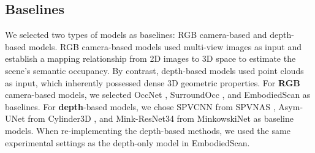 \documentclass[letterpaper, 10 pt, conference]{ieeeconf}  %
\begin{document}
\subsection{Baselines}
We selected two types of models as baselines: RGB camera-based and depth-based models. RGB camera-based models used multi-view images as input and establish a mapping relationship from 2D images to 3D space to estimate the scene's semantic occupancy.  By contrast, depth-based models used point clouds as input, which inherently possessed dense 3D geometric properties. For \textbf{RGB} camera-based models, we selected OccNet \cite{tong2023scene}, SurroundOcc \cite{wei2023surroundocc}, and EmbodiedScan \cite{wang2024embodiedscan} as baselines. For \textbf{depth}-based models, we chose SPVCNN from SPVNAS \cite{tang2020searching}, Asym-UNet from Cylinder3D \cite{zhu2021cylindrical}, and Mink-ResNet34 from MinkowskiNet \cite{choy20194d} as baseline models. When re-implementing the depth-based methods, we used the same experimental settings as the depth-only model in EmbodiedScan.
\end{document}
